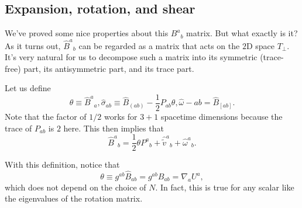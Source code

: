 \subsection*{Expansion, rotation, and shear}
We've proved some nice properties about this $B^a{}_b$ matrix. But what exactly is it? As it turns out, $\hat B^a{}_b$ can be regarded as a matrix that acts on the $2$D space $T_\perp$. It's very natural for us to decompose such a matrix into its symmetric (trace-free) part, its antisymmetric part, and its trace part.
\begin{defn}
    Let us define
    \begin{equation}
        \theta \equiv \hat B^a{}_a, \hat \sigma_{ab} \equiv \hat B_{(ab)}-\frac{1}{2} P_{ab} \theta, \hat \omega-{ab} = \hat B_{[ab]}.
    \end{equation}
    Note that the factor of $1/2$ works for $3+1$ spacetime dimensions because the trace of $P_{ab}$ is $2$ here. This then implies that
    \begin{equation}
        \hat B^a{}_b = \frac{1}{2} \theta P^a{}_b +\hat {\tilde v}^a{}_b +\hat \omega^a{}_b.
    \end{equation}
\end{defn}
With this definition, notice that
\begin{equation}
    \theta \equiv g^{ab} \hat B_{ab} = g^{ab} B_{ab} =\nabla_a U^a,
\end{equation}
which does not depend on the choice of $N$. In fact, this is true for any scalar like the eigenvalues of the rotation matrix.

